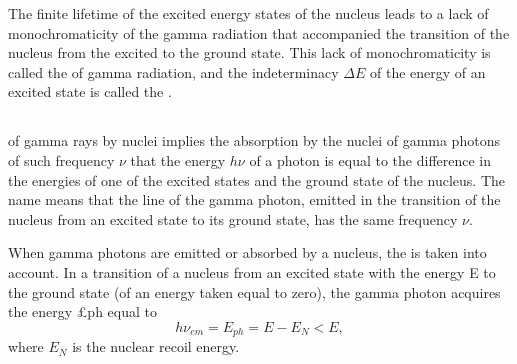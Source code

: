 The finite lifetime of the excited energy states of the nucleus leads to a lack of monochromaticity of the gamma radiation that accompanied the transition of the nucleus from the excited to the ground state. This lack of monochromaticity is called the  of gamma radiation, and the indeterminacy $\Delta E$ of the energy of an excited state is called the .

\subsection{}\label{42.8.2}   of gamma rays by nuclei implies the absorption by the nuclei of gamma photons of such frequency $\nu$ that the energy $h\nu$ of a photon is equal to the difference in the energies of one of the excited states and the ground state of the nucleus. The name means that the line of the gamma photon, emitted in the transition of the nucleus from an excited state to its ground state, has the same frequency $\nu$.

When gamma photons are emitted or absorbed by a nucleus, the
  is taken into account. In a transition of a nucleus from an excited state with the energy E to the ground state (of an energy taken equal to zero), the gamma photon acquires the energy £ph equal to
\begin{equation*}%
h \nu_{em} = E_{ph} = E - E_{N}  < E,
\end{equation*} 
where $E_{N}$ is the nuclear recoil energy.

